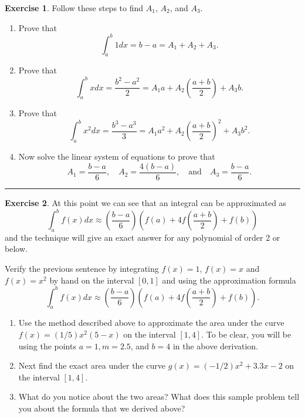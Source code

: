\documentclass[
]{book}
\theoremstyle{definition}
\theoremstyle{definition}
\theoremstyle{definition}
\newtheorem{exercise}{Exercise}[chapter]
\theoremstyle{remark}
\begin{document}
\begin{exercise}
\protect\hypertarget{exr:unnamed-chunk-183}{}{\label{exr:unnamed-chunk-183} }Follow these steps to find \(A_1\), \(A_2\), and \(A_3\).

\begin{enumerate}
\def\labelenumi{\alph{enumi}.}
\item
  Prove that \[\int_a^b 1 dx = b-a = A_1 + A_2 + A_3.\]
\item
  Prove that
  \[\int_a^b x dx = \frac{b^2 - a^2}{2} = A_1 a + A_2 \left( \frac{a+b}{2} \right) + A_3
          b.\]
\item
  Prove that
  \[\int_a^b x^2 dx = \frac{b^3 - a^3}{3} = A_1 a^2 + A_2 \left( \frac{a+b}{2} \right)^2
          + A_3 b^2.\]
\item
  Now solve the linear system of equations to prove that
  \[A_1 = \frac{b-a}{6}, \quad A_2 = \frac{4(b-a)}{6}, \quad \text{and} \quad
          A_3 = \frac{b-a}{6}.\]
\end{enumerate}
\end{exercise}

\begin{center}\rule{0.5\linewidth}{0.5pt}\end{center}

\begin{exercise}
\protect\hypertarget{exr:unnamed-chunk-184}{}{\label{exr:unnamed-chunk-184} }At this point we can see that an integral can be approximated as
\[\int_a^b f(x) dx \approx \left( \frac{b-a}{6} \right) \left( f(a) + 4f\left(
\frac{a+b}{2} \right) + f(b) \right)\] and the technique will give an
exact answer for any polynomial of order 2 or below.

Verify the previous sentence by integrating \(f(x) = 1\), \(f(x) = x\) and
\(f(x) = x^2\) by hand on the interval \([0,1]\) and using the approximation
formula
\[\int_a^b f(x) dx \approx \left( \frac{b-a}{6} \right) \left( f(a) + 4f\left(
\frac{a+b}{2} \right) + f(b) \right).\]

\begin{enumerate}
\def\labelenumi{\alph{enumi}.}
\item
  Use the method described above to approximate the area under the
  curve \(f(x) = (1/5) x^2 (5-x)\) on the interval \([1,4]\). To be clear,
  you will be using the points \(a=1, m=2.5\), and \(b=4\) in the above
  derivation.
\item
  Next find the exact area under the curve \(g(x) = (-1/2)x^2 +3.3x -2\)
  on the interval \([1,4]\).
\item
  What do you notice about the two areas? What does this sample
  problem tell you about the formula that we derived above?
\end{enumerate}
\end{exercise}
\end{document}
